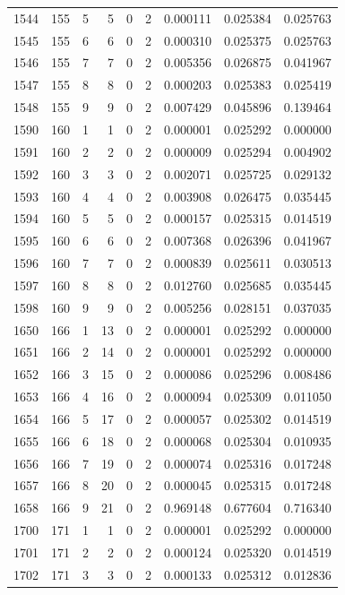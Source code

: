 \begin{longtable}{rrrrrrrrr}
1544 & 155 & 5 & 5 & 0 & 2 & 0.000111 & 0.025384 & 0.025763 \\
1545 & 155 & 6 & 6 & 0 & 2 & 0.000310 & 0.025375 & 0.025763 \\
1546 & 155 & 7 & 7 & 0 & 2 & 0.005356 & 0.026875 & 0.041967 \\
1547 & 155 & 8 & 8 & 0 & 2 & 0.000203 & 0.025383 & 0.025419 \\
1548 & 155 & 9 & 9 & 0 & 2 & 0.007429 & 0.045896 & 0.139464 \\
1590 & 160 & 1 & 1 & 0 & 2 & 0.000001 & 0.025292 & 0.000000 \\
1591 & 160 & 2 & 2 & 0 & 2 & 0.000009 & 0.025294 & 0.004902 \\
1592 & 160 & 3 & 3 & 0 & 2 & 0.002071 & 0.025725 & 0.029132 \\
1593 & 160 & 4 & 4 & 0 & 2 & 0.003908 & 0.026475 & 0.035445 \\
1594 & 160 & 5 & 5 & 0 & 2 & 0.000157 & 0.025315 & 0.014519 \\
1595 & 160 & 6 & 6 & 0 & 2 & 0.007368 & 0.026396 & 0.041967 \\
1596 & 160 & 7 & 7 & 0 & 2 & 0.000839 & 0.025611 & 0.030513 \\
1597 & 160 & 8 & 8 & 0 & 2 & 0.012760 & 0.025685 & 0.035445 \\
1598 & 160 & 9 & 9 & 0 & 2 & 0.005256 & 0.028151 & 0.037035 \\
1650 & 166 & 1 & 13 & 0 & 2 & 0.000001 & 0.025292 & 0.000000 \\
1651 & 166 & 2 & 14 & 0 & 2 & 0.000001 & 0.025292 & 0.000000 \\
1652 & 166 & 3 & 15 & 0 & 2 & 0.000086 & 0.025296 & 0.008486 \\
1653 & 166 & 4 & 16 & 0 & 2 & 0.000094 & 0.025309 & 0.011050 \\
1654 & 166 & 5 & 17 & 0 & 2 & 0.000057 & 0.025302 & 0.014519 \\
1655 & 166 & 6 & 18 & 0 & 2 & 0.000068 & 0.025304 & 0.010935 \\
1656 & 166 & 7 & 19 & 0 & 2 & 0.000074 & 0.025316 & 0.017248 \\
1657 & 166 & 8 & 20 & 0 & 2 & 0.000045 & 0.025315 & 0.017248 \\
1658 & 166 & 9 & 21 & 0 & 2 & 0.969148 & 0.677604 & 0.716340 \\
1700 & 171 & 1 & 1 & 0 & 2 & 0.000001 & 0.025292 & 0.000000 \\
1701 & 171 & 2 & 2 & 0 & 2 & 0.000124 & 0.025320 & 0.014519 \\
1702 & 171 & 3 & 3 & 0 & 2 & 0.000133 & 0.025312 & 0.012836 \\

\end{longtable}

